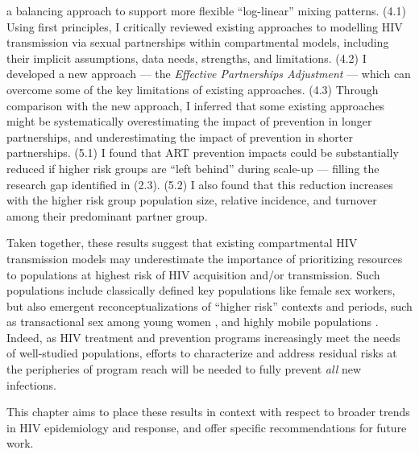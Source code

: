 a balancing approach to support more flexible ``log-linear'' mixing patterns.
(4.1) Using first principles, I critically reviewed existing approaches to
modelling HIV transmission via sexual partnerships within compartmental models,
including their implicit assumptions, data needs, strengths, and limitations.
(4.2) I developed a new approach --- the \emph{Effective Partnerships Adjustment} ---
which can overcome some of the key limitations of existing approaches.
(4.3) Through comparison with the new approach, I inferred that
some existing approaches might be systematically
overestimating the impact of prevention in longer partnerships, and
underestimating the impact of prevention in shorter partnerships.
(5.1) I found that ART prevention impacts could be substantially reduced
if higher risk groups are ``left behind'' during scale-up
--- \ie filling the research gap identified in (2.3).
(5.2) I also found that this reduction increases with the higher risk group
population size, relative incidence, and turnover among their predominant partner group.
\par
Taken together, these results suggest that existing compartmental HIV transmission models
may underestimate the importance of prioritizing resources to
populations at highest risk of HIV acquisition and/or transmission.
Such populations include classically defined key populations like female sex workers,
but also emergent reconceptualizations of ``higher risk'' contexts and periods,
such as transactional sex among young women \cite{Wamoyi2016,Cheuk2020},
and highly mobile populations \cite{Akullian2017}.
Indeed, as HIV treatment and prevention programs
increasingly meet the needs of well-studied populations,
efforts to characterize and address residual risks at the peripheries of program reach
will be needed to fully prevent \emph{all} new infections.
\par
This chapter aims to place these results in context with respect to
broader trends in HIV epidemiology and response,
and offer specific recommendations for future work.
